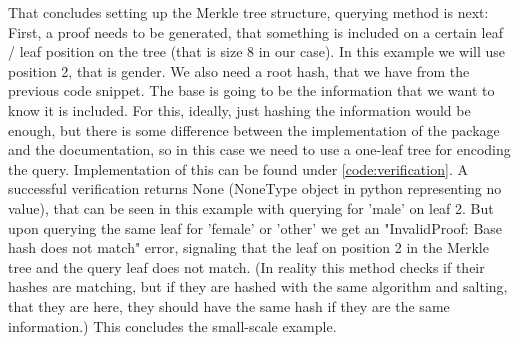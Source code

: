 \documentclass[english, 12pt, a4paper, sci, utf8, a-2b, online]{aaltothesis}
\theoremstyle{change}
\theoremstyle{theoremstyle}
\begin{document}
That concludes setting up the Merkle tree structure, querying method is next:\\
\noindent First, a proof needs to be generated, that something is included on a certain leaf / leaf position on the tree (that is size 8 in our case). In this example we will use position 2, that is gender. We also need a root hash, that we have from the previous code snippet. The base is going to be the information that we want to know it is included. For this, ideally, just hashing the information would be enough, but there is some difference between the implementation of the package and the documentation, so in this case we need to use a one-leaf tree for encoding the query. Implementation of this can be found under \ref{code:verification}. A successful verification returns None (NoneType object in python representing no value), that can be seen in this example with querying for 'male' on leaf 2. But upon querying the same leaf for 'female' or 'other' we get an "InvalidProof: Base hash does not match" error, signaling that the leaf on position 2 in the Merkle tree and the query leaf does not match. (In reality this method checks if their hashes are matching, but if they are hashed with the same algorithm and salting, that they are here, they should have the same hash if they are the same information.) This concludes the small-scale example.\\
\end{document}
